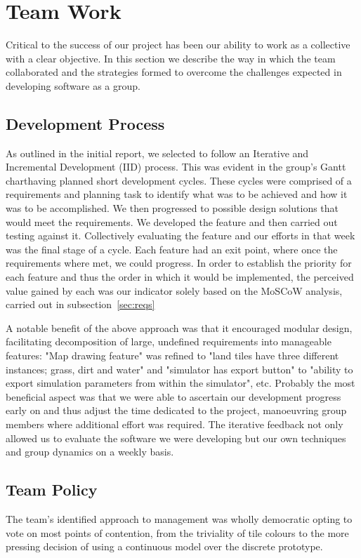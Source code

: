 \section{Team Work}
\label{sec:team_work}
Critical to the success of our project has been our ability to work as a collective with a clear objective. In this section we describe the way in which the team collaborated and the strategies formed to overcome the challenges expected in developing software as a group.

\subsection{Development Process}\label{ss:dev-process}
As outlined in the initial report, we selected to follow an Iterative and Incremental Development (IID) process. This was evident in the group's Gantt chart\footnotemark[01] having planned short development cycles. These cycles were comprised of a requirements and planning task to identify what was to be achieved and how it was to be accomplished. We then progressed to possible design solutions that would meet the requirements. We developed the feature and then carried out testing against it. Collectively evaluating the feature and our efforts in that week was the final stage of a cycle. Each feature had an exit point, where once the requirements where met, we could progress. In order to establish the priority for each feature and thus the order in which it would be implemented, the perceived value gained by each was our indicator solely based on the MoSCoW analysis, carried out in subsection~\ref{sec:reqs}

A notable benefit of the above approach was that it encouraged modular design, facilitating decomposition of large, undefined requirements into manageable features: "Map drawing feature" was refined to "land tiles have three different instances; grass, dirt and water" and "simulator has export button" to "ability to export simulation parameters from within the simulator", etc.  
Probably the most beneficial aspect was that we were able to ascertain our development progress early on and thus adjust the time dedicated to the project, manoeuvring group members where additional effort was required. The iterative feedback not only allowed us to evaluate the software we were developing but our own techniques and group dynamics on a weekly basis.

\subsection{Team Policy}
The team's identified approach to management was wholly democratic opting to vote on most points of contention, from the triviality of tile colours to the more pressing decision of using a continuous model over the discrete prototype.

